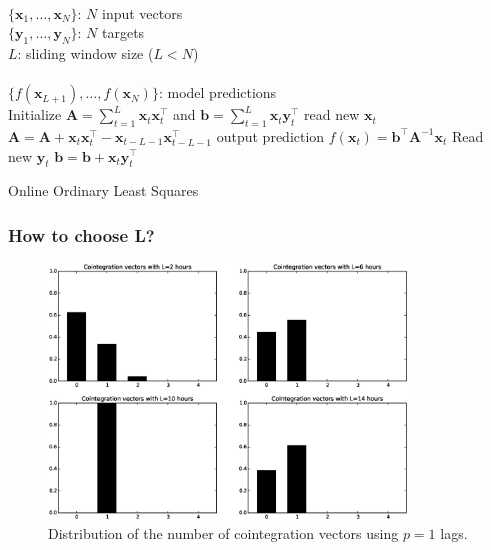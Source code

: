\documentclass{beamer}
\begin{document}
\begin{frame}
\begin{algorithm}[H]
\begin{algorithmic}[1]
\REQUIRE $\,$ \\
$\{\mathbf{x}_1,\dots,\mathbf{x}_N \}$: $N$ input vectors \\
$\{\mathbf{y}_1,\dots,\mathbf{y}_N \}$: $N$ targets \\
$L$: sliding window size ($L<N$) \\
\ENSURE  $\,$ \\
$\{f(\mathbf{x}_{L+1}),\dots,f(\mathbf{x}_N) \}$: model predictions \\
\STATE Initialize $\mathbf{A}=\displaystyle \sum_{t=1}^L \mathbf{x}_t
\mathbf{x}_t^\intercal$
and $\mathbf{b}=\displaystyle \sum_{t=1}^L \mathbf{x}_t \mathbf{y}^\intercal_{t}$
        \STATE read new $\mathbf{x}_t$
        \STATE $\mathbf{A} = \mathbf{A} + \mathbf{x}_t \mathbf{x}_t^\intercal-
\mathbf{x}_{t-L-1} \mathbf{x}_{t-L-1}^\intercal  $
        \STATE output prediction $f(\mathbf{x}_t) =  \mathbf{b}^\intercal
\mathbf{A}^{-1}\mathbf{x}_t$
        \STATE Read new $\mathbf{y}_t$
        \STATE $\mathbf{b} = \mathbf{b} + \mathbf{x}_t \mathbf{y}^\intercal_{t}$
\ENDFOR
\end{algorithmic}
\caption{Online Ordinary Least Squares}
\label{alg:SLAAR}
\end{algorithm}
\end{frame}



\begin{frame}
\frametitle{How to choose L?}
  \begin{figure}[!h]
  \centering
   \includegraphics[width=0.85\textwidth]{img/51_Fig1}
  \caption[Distribution of the number of cointegration vectors using $p=1$ lags]{Distribution of the number of cointegration vectors using $p=1$ lags.}
  \label{fig:hists}
\end{figure}
\end{frame}
\end{document}
